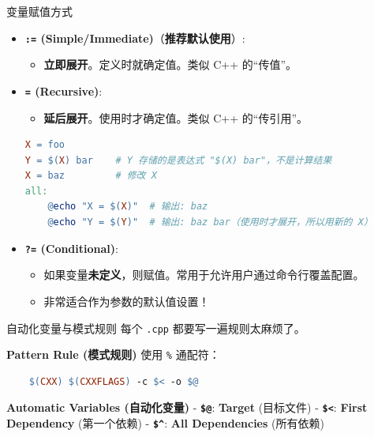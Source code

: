 \documentclass[aspectratio=169,10pt]{beamer}
\begin{document}
\begin{frame}[fragile,shrink=12]{变量赋值方式}
\footnotesize
\begin{itemize}
\item
  \textbf{\texttt{:=} (Simple/Immediate)}（\textbf{推荐默认使用}）:

  \begin{itemize}
  \item
    \textbf{立即展开}。定义时就确定值。类似 C++ 的``传值''。
  \end{itemize}
\item
  \textbf{\texttt{=} (Recursive)}:

  \begin{itemize}
  \item
    \textbf{延后展开}。使用时才确定值。类似 C++ 的``传引用''。
  \end{itemize}

\begin{lstlisting}[language=make]
X = foo
Y = $(X) bar    # Y 存储的是表达式 "$(X) bar"，不是计算结果
X = baz         # 修改 X
all:
    @echo "X = $(X)"  # 输出: baz
    @echo "Y = $(Y)"  # 输出: baz bar（使用时才展开，所以用新的 X）
\end{lstlisting}
\item
  \textbf{\texttt{?=} (Conditional)}:

  \begin{itemize}
  \item
    如果变量\textbf{未定义}，则赋值。常用于允许用户通过命令行覆盖配置。
  \item
    非常适合作为参数的默认值设置！
  \end{itemize}
\end{itemize}
\end{frame}

\begin{frame}[fragile,shrink=12]{自动化变量与模式规则}
\footnotesize
每个 \texttt{.cpp} 都要写一遍规则太麻烦了。

\textbf{Pattern Rule (模式规则)} 使用 \texttt{\%} 通配符：

\begin{lstlisting}[language=make]
%.o: %.cpp
    $(CXX) $(CXXFLAGS) -c $< -o $@
\end{lstlisting}

\textbf{Automatic Variables (自动化变量)} - \textbf{\texttt{\$@}}: \textbf{Target} (目标文件) - \textbf{\texttt{\$\textless{}}}: \textbf{First Dependency} (第一个依赖) - \textbf{\texttt{\$\^{}}}: \textbf{All Dependencies} (所有依赖)
\end{frame}
\end{document}
